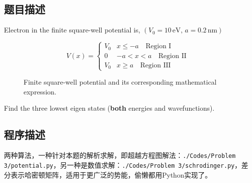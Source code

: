 \subsection{题目描述}
Electron in the finite square-well potential is, \( (V_0 = 10 \, \text{eV}, \, a = 0.2 \, \text{nm}) \)

\begin{figure}[h!]
    \centering
    \begin{minipage}{0.45\textwidth}
        \[
            V(x) =
            \begin{cases}
                V_0 & x \leq -a \quad \text{Region I}   \\
                0   & -a < x < a \quad \text{Region II} \\
                V_0 & x \geq a \quad \text{Region III}
            \end{cases}
        \]
    \end{minipage}
    \hspace{0.05\textwidth} %
    \begin{minipage}{0.4\textwidth}
        \centering
    \end{minipage}
    \caption{Finite square-well potential and its corresponding mathematical expression.}
\end{figure}


Find the three lowest eigen states (\textbf{both} energies and wavefunctions).
\subsection{程序描述}
两种算法，一种针对本题的解析求解，即超越方程图解法：\texttt{./Codes/Problem 3/potential.py}，另一种是数值求解：\texttt{./Codes/Problem 3/schrodinger.py}，差分表示哈密顿矩阵，适用于更广泛的势能，偷懒都用Python实现了。

